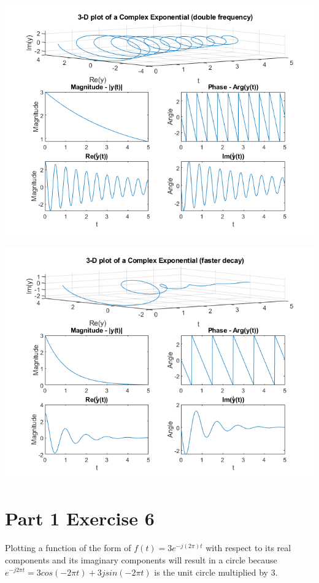 \documentclass[11pt]{article}
\begin{document}
\includegraphics[scale=0.7]{Exercise5_higherfrequency.png}

\includegraphics[scale=0.7]{Exercise5_higherdecay.png}



\pagebreak 
\section{Part 1 Exercise 6}

Plotting a function of the form of $f(t) = 3e^{-j(2\pi)t}$ with respect to its real components and its imaginary components will result in a circle because $e^{-j2\pi t} = 3cos(-2\pi t) + 3jsin(-2\pi t)$ is the unit circle multiplied by 3.\\
\end{document}
